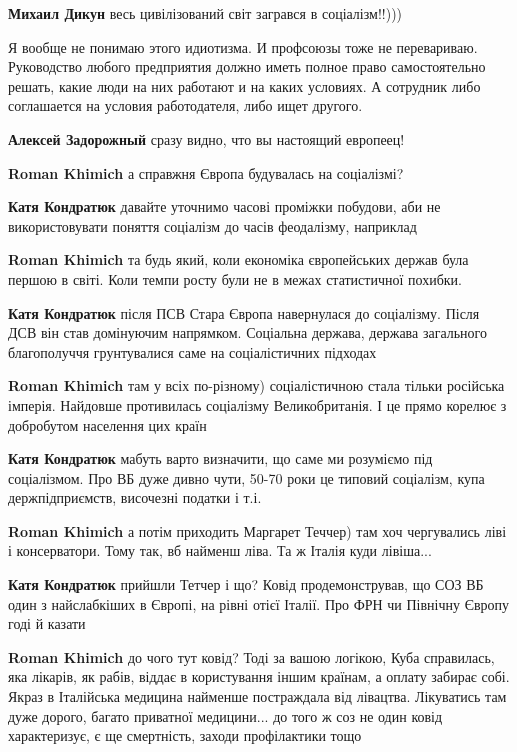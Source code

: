 \begin{itemize}
\begin{itemize}
\textbf{Михаил Дикун} весь цивілізований світ загрався в соціалізм!!)))
\end{itemize} %


Я вообще не понимаю этого идиотизма. И профсоюзы тоже не перевариваю.
Руководство любого предприятия должно иметь полное право самостоятельно решать,
какие люди на них работают и на каких условиях. А сотрудник либо соглашается на
условия работодателя, либо ищет другого.

\begin{itemize} %
\textbf{Алексей Задорожный} сразу видно, что вы настоящий европеец!

\textbf{Roman Khimich} а справжня Європа будувалась на соціалізмі?

\textbf{Катя Кондратюк} давайте уточнимо часові проміжки побудови, аби не використовувати поняття соціалізм до часів феодалізму, наприклад

\textbf{Roman Khimich} та будь який, коли економіка європейських держав була першою в світі. Коли темпи росту були не в межах статистичної похибки.

\textbf{Катя Кондратюк} після ПСВ Стара Європа навернулася до соціалізму. Після ДСВ він став домінуючим напрямком. Соціальна держава, держава загального благополуччя грунтувалися саме на соціалістичних підходах

\textbf{Roman Khimich} там у всіх по-різному) соціалістичною стала тільки російська імперія. Найдовше противилась соціалізму Великобританія. І це прямо корелює з добробутом населення цих країн

\textbf{Катя Кондратюк} мабуть варто визначити, що саме ми розуміємо під соціалізмом.
Про ВБ дуже дивно чути, 50-70 роки це типовий соціалізм, купа держпідприємств, височезні податки і т.і.

\textbf{Roman Khimich} а потім приходить Маргарет Теччер) там хоч чергувались ліві і консерватори. Тому так, вб найменш ліва. Та ж Італія куди лівіша...

\textbf{Катя Кондратюк} прийшли Тетчер і що? Ковід продемонстрував, що СОЗ ВБ один з найслабкіших в Європі, на рівні отієї Італії. Про ФРН чи Північну Європу годі й казати

\textbf{Roman Khimich} до чого тут ковід? Тоді за вашою логікою, Куба справилась, яка лікарів, як рабів, віддає в користування іншим країнам, а оплату забирає собі. Якраз в Італійська медицина найменше постраждала від лівацтва. Лікуватись там дуже дорого, багато приватної медицини... до того ж соз не один ковід характеризує, є ще смертність, заходи профілактики тощо


\end{itemize}
\end{itemize}
